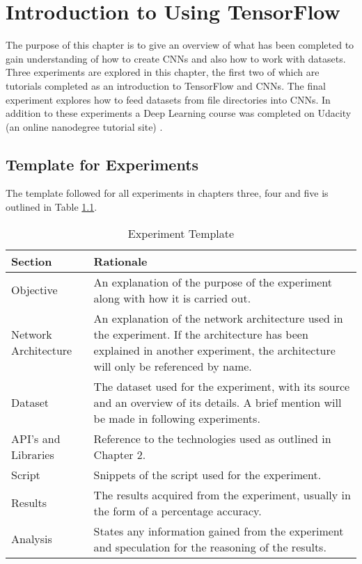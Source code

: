 \chapter{Introduction to Using TensorFlow}
The purpose of this chapter is to give an overview of what has been completed to gain understanding of how to create CNNs and also how to work with datasets.
Three experiments are explored in this chapter, the first two of which are tutorials completed as an introduction to TensorFlow and CNNs.
The final experiment explores how to feed datasets from file directories into CNNs.
In addition to these experiments a Deep Learning course was completed on Udacity (an online nanodegree tutorial site) \parencite{udacity}.

\section{Template for Experiments}
The template followed for all experiments in chapters three, four and five is outlined in Table \ref{expTemplate}.

\begin{table}[h]
\centering
\caption{Experiment Template}
\label{expTemplate}
\begin{tabular}{|p{2cm}|p{10.5cm}|}
\hline
\textbf{Section}   & \textbf{Rationale}                \\ \hline
Objective             & An explanation of the purpose of the experiment along with how it is carried out. \\ \hline
Network Architecture & An explanation of the network architecture used in the experiment. If the architecture has been explained in another experiment, the architecture will only be referenced by name.                       \\ \hline
Dataset              & The dataset used for the experiment, with its source and an overview of its details. A brief mention will be made in following experiments.                       \\ \hline
API's and Libraries               & Reference to the technologies used as outlined in Chapter 2.                      \\ \hline
Script               & Snippets of the script used for the experiment.                       \\ \hline
Results              & The results acquired from the experiment, usually in the form of a percentage accuracy.                       \\ \hline
Analysis   & States any information gained from the experiment and speculation for the reasoning of the results.                      \\ \hline
\end{tabular}
\end{table}

